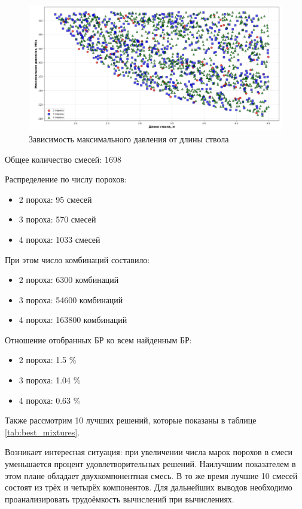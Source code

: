 \documentclass[14pt, a4paper]{extreport} %
\begin{document}
\begin{figure}[H]
\centering
\includegraphics[width=1\textwidth]{imgs/2.4 fig2.png}
\caption{Зависимость максимального давления от длины ствола}
\label{fig:pressure_vs_length}
\end{figure}

Общее количество смесей: 1698

Распределение по числу порохов:

\begin{itemize}
    \item 2 пороха: 95 смесей
    \item 3 пороха: 570 смесей  
    \item 4 пороха: 1033 смесей
\end{itemize}

При этом число комбинаций составило:

\begin{itemize}
    \item 2 пороха: 6300 комбинаций
    \item 3 пороха: 54600 комбинаций
    \item 4 пороха: 163800 комбинаций
\end{itemize}

Отношение отобранных БР ко всем найденным БР: 

\begin{itemize}
    \item 2 пороха: 1.5 \%
    \item 3 пороха: 1.04 \%
    \item 4 пороха: 0.63 \%
\end{itemize}

Также рассмотрим 10 лучших решений, которые показаны в таблице \ref{tab:best_mixtures}.

Возникает интересная ситуация: при увеличении числа марок порохов в смеси уменьшается процент удовлетворительных решений. Наилучшим показателем в этом плане обладает двухкомпонентная смесь. В то же время лучшие 10 смесей состоят из трёх и четырёх компонентов.
Для дальнейших выводов необходимо проанализировать трудоёмкость вычислений при вычислениях.
\end{document}
